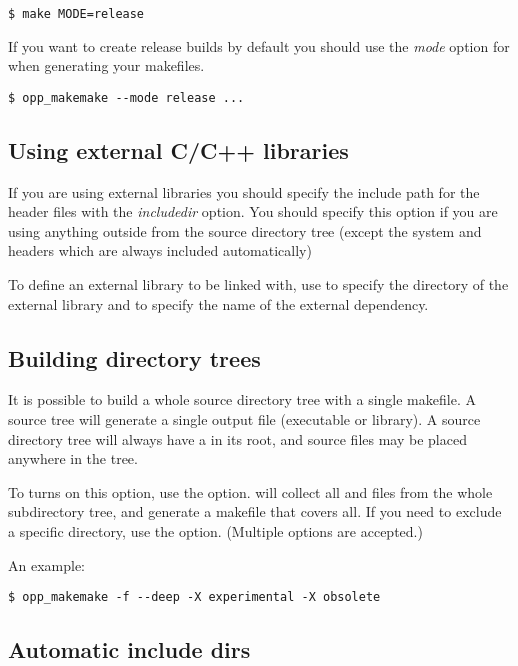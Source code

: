 \begin{verbatim}
$ make MODE=release
\end{verbatim}

If you want to create release builds by default you should use the  \textit{mode}
option for  when generating your makefiles.
\begin{verbatim}
$ opp_makemake --mode release ...
\end{verbatim}


\subsection{Using external C/C++ libraries}

If you are using external libraries you should specify the include path for the header files
with the  \textit{includedir} option. You should specify this option if you are using
anything outside from the source directory tree (except the system and {\opp} headers which are
always included automatically)

To define an external library to be linked with, use  to specify
the directory of the external library and  to specify the name of the
external dependency.


\subsection{Building directory trees}

It is possible to build a whole source directory tree with a single makefile.
A source tree will generate a single output file (executable or library).
A source directory tree will always have a  in its root,
and source files may be placed anywhere in the tree.

To turns on this option, use the  option.
 will collect all  and  files from
the whole subdirectory tree, and generate a makefile that covers all.
If you need to exclude a specific directory, use the 
option. (Multiple  options are accepted.)

An example:

\begin{verbatim}
$ opp_makemake -f --deep -X experimental -X obsolete
\end{verbatim}


\subsection{Automatic include dirs}


